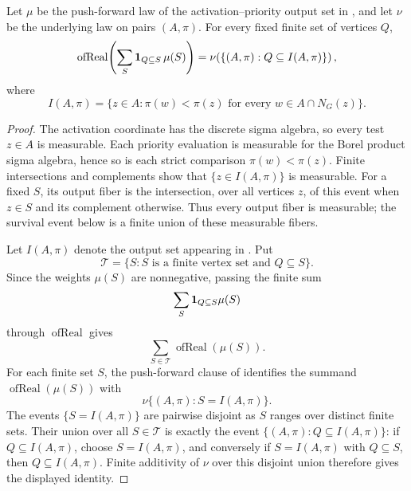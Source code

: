 \begin{helper}
Let $\mu$ be the push-forward law of the activation--priority output set in
, and let $\nu$ be the underlying law on
pairs $(A,\pi)$.  For every fixed finite set of vertices $Q$,
\[
\operatorname{ofReal}\!\left(\sum_S
  {\bf 1}_{Q\subseteq S}\,\mu(S)\right)
=
\nu\!\left(\{(A,\pi):Q\subseteq I(A,\pi)\}\right),
\]
where
\[
I(A,\pi)=\{z\in A:\pi(w)<\pi(z)\text{ for every }w\in A\cap N_G(z)\}.
\]
\end{helper}
\begin{proof}
The activation coordinate has the discrete sigma algebra, so every test
$z\in A$ is measurable. Each priority evaluation is measurable for the
Borel product sigma algebra, hence so is each strict comparison
$\pi(w)<\pi(z)$. Finite intersections and complements show that
$\{z\in I(A,\pi)\}$ is measurable. For a fixed $S$, its output fiber is the
intersection, over all vertices $z$, of this event when $z\in S$ and its
complement otherwise. Thus every output fiber is measurable; the
survival event below is a finite union of these measurable fibers.

Let $I(A,\pi)$ denote the output set appearing in
.  Put
\[
\mathcal T=\{S:S\text{ is a finite vertex set and }Q\subseteq S\}.
\]
Since the weights $\mu(S)$ are nonnegative, passing the finite sum
\[
\sum_S {\bf 1}_{Q\subseteq S}\mu(S)
\]
through $\operatorname{ofReal}$ gives
\[
\sum_{S\in\mathcal T}\operatorname{ofReal}(\mu(S)).
\]
For each finite set $S$, the push-forward clause of
 identifies the summand
\(\operatorname{ofReal}(\mu(S))\) with
\[
\nu\{(A,\pi):S=I(A,\pi)\}.
\]
The events $\{S=I(A,\pi)\}$ are pairwise disjoint as $S$ ranges over distinct
finite sets.  Their union over all $S\in\mathcal T$ is exactly the event
\(\{(A,\pi):Q\subseteq I(A,\pi)\}\): if $Q\subseteq I(A,\pi)$, choose
$S=I(A,\pi)$, and conversely if $S=I(A,\pi)$ with $Q\subseteq S$, then
$Q\subseteq I(A,\pi)$.  Finite additivity of $\nu$ over this disjoint union
therefore gives the displayed identity.
\end{proof}
